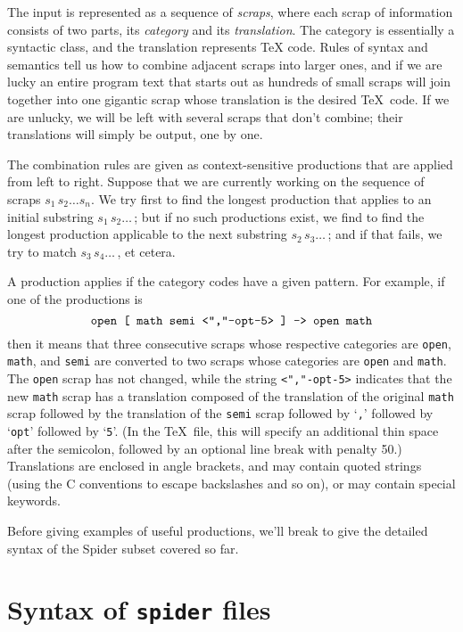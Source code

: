 The input is represented as a sequence of  {\em scraps}, 
where each scrap of information consists
of two parts, its {\em category} and its {\em translation}. 
The category
is essentially a syntactic class, and the translation represents
{\TeX} code.
Rules of syntax and semantics tell us how to
combine adjacent scraps into larger ones, and if we are lucky an entire
program text that starts out as hundreds of small scraps will join
together into one gigantic scrap whose translation is the desired \TeX\
code. 
If we are unlucky, we will be left with several scraps that don't
combine; their translations will simply be output, one by one.

The combination rules are given as context-sensitive productions that are
applied from left to right. Suppose that we are currently working on the
sequence of scraps $s_1\,s_2\ldots s_n$. We try first to find the longest
production that applies to an initial substring $s_1\,s_2\ldots\,$; but if
no such productions exist, we find to find the longest production
applicable to the next substring $s_2\,s_3\ldots\,$; and if that fails, we
try to match $s_3\,s_4\ldots\,$, et cetera.

A production applies if the category codes have a given pattern. For
example, if one of the productions is
$$\hbox{\tt open [ math semi <"\relax\relax,"-opt-5> ] -->
open math}$$ 
then it means that three consecutive scraps whose respective categories are
{\tt open}, {\tt math}, and {\tt semi} are con\-verted to two scraps whose categories
are {\tt open} and {\tt math}. 
 The {\tt open} scrap has not changed, while the string 
{\tt <"\BS\BS,"-opt-5>} 
indicates that the new {\tt math} scrap
has a translation composed of the translation of the original
{\tt math} scrap followed by the translation of the {\tt semi} scrap followed
by `{\tt \BS,}' followed by `{\tt opt}' followed by `{\tt5}'. (In the \TeX\ file,
this will specify an additional thin space after the semicolon, followed
by an optional line break with penalty 50.) 
Translations are enclosed in angle brackets, and may contain quoted
strings (using the C conventions to escape backslashes and so on), or
may contain special keywords.

Before giving examples of useful productions, we'll break to give the
detailed syntax of the {Spider} subset covered so far.



\section{Syntax of {\tt spider} files}

